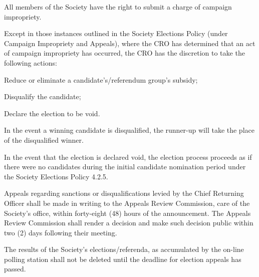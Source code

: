 \begin{longenum}[ label*=\thesubsection.\arabic*., align=left]
	\item All members of the Society have the right to submit a charge of campaign impropriety.
    \item Except in those instances outlined in the Society Elections Policy (under Campaign Impropriety and Appeals), where the CRO has determined that an act of campaign impropriety  has occurred, the CRO has the discretion to take the following actions:
   
    \begin{longenum}[ label*=\arabic*., align=left]
		\item Reduce or eliminate a candidate's/referendum group's subsidy;
        \item Disqualify the candidate;
        \item Declare the election to be void.
	\end{longenum}
    \item In the event a winning candidate is disqualified, the runner-up will take the place of the disqualified winner.
    \begin{longenum}[ label*=\arabic*., align=left]
		\item In the event that the election is declared void, the election process proceeds as if there were no candidates during the initial candidate nomination period under the Society Elections Policy 4.2.5. 
	\end{longenum}
    \item Appeals regarding sanctions or disqualifications levied by the Chief Returning Officer shall be made in writing to the Appeals Review Commission, care of the Society's office, within forty-eight (48) hours of the announcement. The Appeals Review Commission shall render a decision and make such decision public within two (2) days following their meeting.
    \item The results of the Society's elections/referenda, as accumulated by the on-line polling station shall not be deleted until the deadline for election appeals has passed.
\end{longenum}

